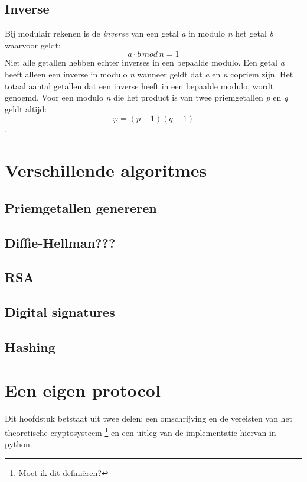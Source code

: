 \documentclass{report} %
\begin{document}
\section{Inverse}
Bij modulair rekenen is de \textit{inverse} van een getal \textit{a} in modulo \textit{n} het getal \textit{b} waarvoor geldt: \begin{equation}{a \cdot b \, mod \, n = 1}\end{equation} Niet alle getallen hebben echter inverses in een bepaalde modulo. Een getal \textit{a} heeft alleen een inverse in modulo \textit{n} wanneer geldt dat \textit{a} en \textit{n} copriem zijn. Het totaal aantal getallen dat een inverse heeft in een bepaalde modulo, wordt \textphi \, genoemd. Voor een modulo \textit{n} die het product is van twee priemgetallen \textit{p} en \textit{q} geldt altijd: \begin{equation} \varphi = (p-1)(q-1) \end{equation}.


\chapter{Verschillende algoritmes} %
\section{Priemgetallen genereren}

\section{Diffie-Hellman???}

\section{RSA}

\section{Digital signatures}


\section{Hashing}

\chapter{Een eigen protocol}
Dit hoofdstuk betstaat uit twee delen: een omschrijving en de vereisten van het theoretische cryptosysteem \footnote{Moet ik dit definiëren?} en een uitleg van de implementatie hiervan in python.
\end{document}
